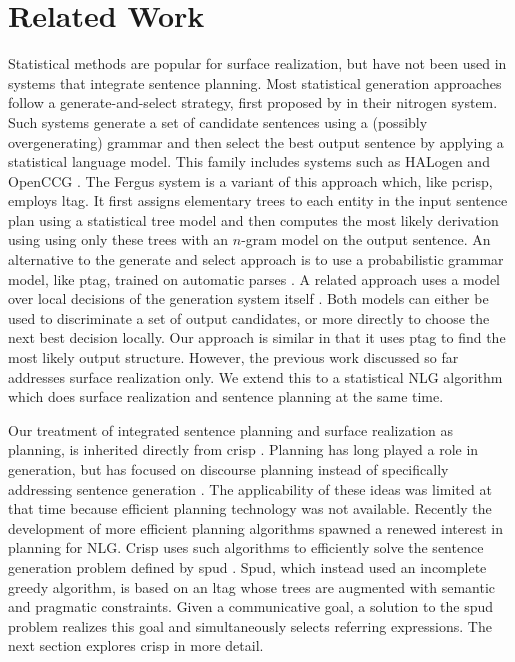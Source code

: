 \section{Related Work}
\label{sec:related}

Statistical methods are popular for surface realization, but have not been used in systems that integrate sentence planning. Most statistical generation approaches follow a generate-and-select strategy, first proposed by  in their {\sc nitrogen} system. Such systems generate a set of candidate sentences using a (possibly overgenerating) grammar and then select the best output sentence by applying a statistical language model. This family includes systems such as {\sc HAL}ogen \cite{langkildeknight1998,langkilde2000} and OpenCCG \cite{whitebaldridge2003}.  The {\sc Fergus} system \cite{bangalorerambow2000} is a variant of this approach which, like {\sc pcrisp}, employs {\sc ltag}. It first assigns elementary trees to each entity in the input sentence plan using a statistical tree model and then computes the most likely derivation using using only these trees with an $n$-gram model on the output sentence. An alternative to the generate and select approach is to use a probabilistic grammar model, like {\sc   ptag}, trained on automatic parses \cite{zhongstent2005}. A related approach uses a model over local decisions of the generation system itself \cite{belz2008}. Both models can either be used to discriminate a set of output candidates, or more directly to choose the next best decision locally. Our approach is similar in that it uses {\sc ptag} to find the most likely output structure. However, the previous work discussed so far addresses surface realization only. We extend this to a statistical NLG algorithm which does surface realization and sentence planning at the same time.

Our treatment of integrated sentence planning and surface realization as planning, is inherited directly from {\sc crisp} \cite{kollerstone2007}.  Planning has long played a role in generation, but has focused on discourse planning instead of specifically addressing sentence generation \cite{hovy1988,appelt1992}. The applicability of these ideas was limited at that time because efficient planning technology was not available. Recently the development of more efficient planning algorithms \cite{hoffmannnebel2001} spawned a renewed interest in planning for NLG.  {\sc Crisp} uses such algorithms to efficiently solve the sentence generation problem defined by {\sc spud} \cite{Stone2003a}. {\sc Spud}, which instead used an incomplete greedy algorithm, is based on an {\sc ltag} whose trees are augmented with semantic and pragmatic constraints. Given a communicative goal, a solution to the {\sc spud} problem realizes this goal and simultaneously selects referring expressions. The next section explores {\sc crisp} in more detail.




